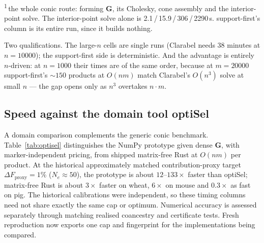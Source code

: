 \documentclass[11pt]{article}
\newcommand{\bG}{\mathbf{G}}
\begin{document}
\noindent\textsuperscript{1}\,the whole conic route: forming $\bG$, its Cholesky, cone assembly and the interior-point solve. The interior-point solve alone is 2.1\,/\,15.9\,/\,306\,/\,2290\,s. support-first's column is its entire run, since it builds nothing.

Two qualifications. The large-$n$ cells are single runs (Clarabel needs 38 minutes at $n=10000$); the support-first side is deterministic. And the advantage is entirely $n$-driven: at $n=1000$ their times are of the same order, because at $m=20000$ support-first's ${\sim}150$ products at $O(nm)$ match Clarabel's $O(n^3)$ solve at small $n$ --- the gap opens only as $n^3$ overtakes $n\cdot m$.

\subsection{Speed against the domain tool optiSel}

A domain comparison complements the generic conic benchmark. Table~\ref{tab:optisel} distinguishes the NumPy prototype given dense $\bG$, with marker-independent pricing, from shipped matrix-free Rust at $O(nm)$ per product. At the historical approximately matched contribution-proxy target $\Delta F_{\mathrm{proxy}}=1\%$ ($N_e\approx50$), the prototype is about $12$--$133\times$ faster than optiSel; matrix-free Rust is about $3\times$ faster on wheat, $6\times$ on mouse and $0.3\times$ as fast on pig. The historical calibrations were independent, so these timing columns need not share exactly the same cap or optimum. Numerical accuracy is assessed separately through matching realised coancestry and certificate tests. Fresh reproduction now exports one cap and fingerprint for the implementations being compared.
\end{document}
